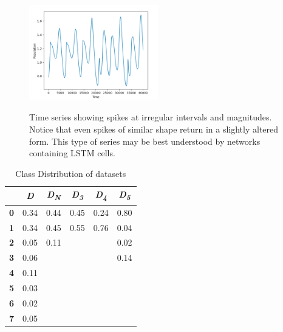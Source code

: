 \documentclass[letterpaper, 10 pt, conference]{ieeeconf}  %
\begin{document}
    \begin{figure}
    {\label{ref_label1}\includegraphics[width=0.5\textwidth]{dataspikes.png}}
        \caption{\label{ref_label_overall}Time series showing spikes at irregular intervals and magnitudes. Notice that even spikes of similar shape return in a slightly altered form. This type of series may be best understood by networks containing LSTM cells.}
    \end{figure} 
    \begin{table}
        \caption{Class Distribution of datasets}
        \setlength{\tabcolsep}{5mm} %
        \def\arraystretch{1.25} %
        \centering
        \begin{tabular}{|c|c|c|c|c|c|}
	        \hline
            & \textbf{\textit{D}} &  \textbf{\textit{D\textsubscript{N}}} &      \textbf{\textit{D\textsubscript{3}}} &  \textbf{\textit{D\textsubscript{4}}} &      \textbf{\textit{D\textsubscript{5}}}\\ \hline
            \textbf{0} & 0.34 & 0.44 & 0.45 & 0.24 & 0.80\\ \hline
            \textbf{1} & 0.34 & 0.45 & 0.55 & 0.76 & 0.04\\ \hline
            \textbf{2} & 0.05 & 0.11 &  &  & 0.02\\ \hline
            \textbf{3} & 0.06 &  &  &  & 0.14\\ \hline
            \textbf{4} & 0.11 &  &  &  & \\ \hline
            \textbf{5} & 0.03 &  &  &  & \\ \hline
            \textbf{6} & 0.02 &  &  &  & \\ \hline
            \textbf{7} & 0.05 &  &  &  & \\ \hline
        \end{tabular}
    \end{table}
\end{document}
